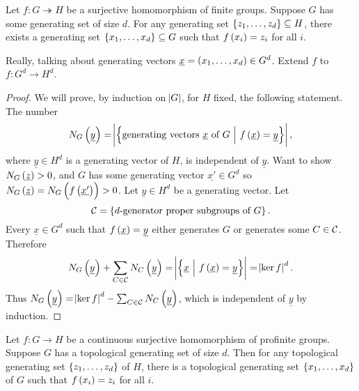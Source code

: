 \begin{theorem}
Let $ f : G \twoheadrightarrow H $ be a surjective homomorphism of finite groups. Suppose $ G $ has some generating set of size $ d $. For any generating set $ \cbr{z_1, \dots, z_d} \subseteq H $, there exists a generating set $ \cbr{x_1, \dots, x_d} \subseteq G $ such that $ f\br{x_i} = z_i $ for all $ i $.
\end{theorem}

Really, talking about generating vectors $ \underline{x} = \br{x_1, \dots, x_d} \in G^d $. Extend $ f $ to $ f : G^d \to H^d $.

\begin{proof}
We will prove, by induction on $ \abs{G} $, for $ H $ fixed, the following statement. The number
$$ N_G\br{\underline{y}} = \abs{\cbr{\text{generating vectors} \ \underline{x} \ \text{of} \ G \st f\br{\underline{x}} = \underline{y}}}, $$
where $ \underline{y} \in H^d $ is a generating vector of $ H $, is independent of $ \underline{y} $. Want to show $ N_G\br{\underline{z}} > 0 $, and $ G $ has some generating vector $ \underline{x'} \in G^d $ so $ N_G\br{\underline{z}} = N_G\br{f\br{\underline{x'}}} > 0 $. Let $ \underline{y} \in H^d $ be a generating vector. Let
$$ \CCC = \cbr{\text{$ d $-generator proper subgroups of} \ G}. $$
Every $ \underline{x} \in G^d $ such that $ f\br{\underline{x}} = \underline{y} $ either generates $ G $ or generates some $ C \in \mathcal{C} $. Therefore
$$ N_G\br{\underline{y}} + \sum_{C \in \CCC} N_C\br{\underline{y}} = \abs{\cbr{\underline{x} \st f\br{\underline{x}} = \underline{y}}} = \abs{\ker f}^d. $$
Thus $ N_G\br{\underline{y}} = \abs{\ker f}^d - \sum_{C \in \CCC} N_C\br{\underline{y}} $, which is independent of $ \underline{y} $ by induction.
\end{proof}

\begin{theorem}
Let $ f : G \to H $ be a continuous surjective homomorphism of profinite groups. Suppose $ G $ has a topological generating set of size $ d $. Then for any topological generating set $ \cbr{z_1, \dots, z_d} $ of $ H $, there is a topological generating set $ \cbr{x_1, \dots, x_d} $ of $ G $ such that $ f\br{x_i} = z_i $ for all $ i $.
\end{theorem}

